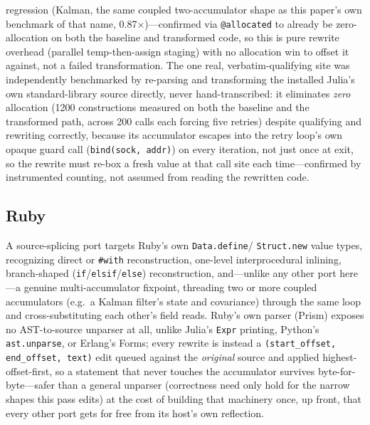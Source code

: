 \documentclass[sigplan,screen,review,anonymous]{acmart}
\begin{document}
regression (Kalman, the same coupled two-accumulator shape as this
paper's own benchmark of that name, 0.87$\times$)---confirmed via
\texttt{@allocated} to already be zero-allocation on both the baseline
and transformed code, so this is pure rewrite overhead (parallel
temp-then-assign staging) with no allocation win to offset it against,
not a failed transformation. The one real, verbatim-qualifying site was
independently benchmarked by re-parsing and transforming the installed
Julia's own standard-library source directly, never hand-transcribed:
it eliminates \emph{zero} allocation (1200 constructions measured on
both the baseline and the transformed path, across 200 calls each
forcing five retries) despite qualifying and rewriting correctly,
because its accumulator escapes into the retry loop's own opaque guard
call (\texttt{bind(sock, addr)}) on every iteration, not just once at
exit, so the rewrite must re-box a fresh value at that call site each
time---confirmed by instrumented counting, not assumed from reading the
rewritten code.

\subsection{Ruby}

A source-splicing port targets Ruby's own \texttt{Data.define}/
\texttt{Struct.new} value types, recognizing direct or \texttt{\#with}
reconstruction, one-level interprocedural inlining, branch-shaped
(\texttt{if}/\texttt{elsif}/\texttt{else}) reconstruction, and---unlike
any other port here---a genuine multi-accumulator fixpoint, threading
two or more coupled accumulators (e.g.\ a Kalman filter's state and
covariance) through the same loop and cross-substituting each other's
field reads. Ruby's own parser (Prism) exposes no AST-to-source
unparser at all, unlike Julia's \texttt{Expr} printing, Python's
\texttt{ast.unparse}, or Erlang's Forms; every rewrite is instead a
\texttt{(start\_offset, end\_offset, text)} edit queued against the
\emph{original} source and applied highest-offset-first, so a statement
that never touches the accumulator survives byte-for-byte---safer than
a general unparser (correctness need only hold for the narrow shapes
this pass edits) at the cost of building that machinery once, up front,
that every other port gets for free from its host's own reflection.
\end{document}
